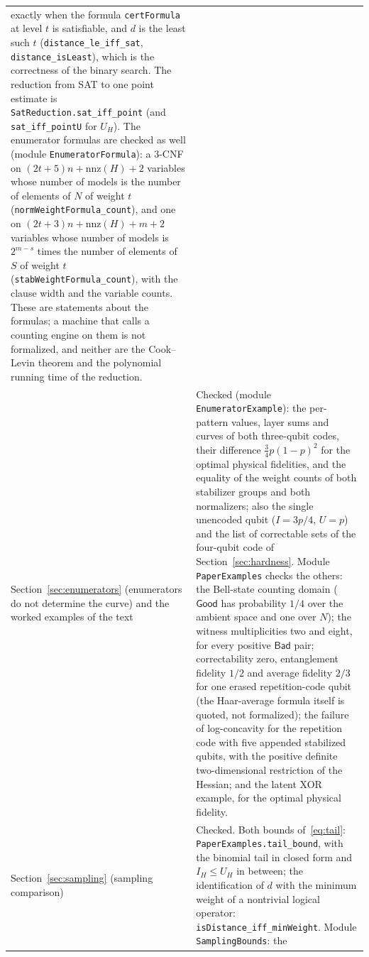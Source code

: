\documentclass[11pt]{article}
\theoremstyle{remark}
\newcommand{\Good}{\mathsf{Good}}
\newcommand{\Bad}{\mathsf{Bad}}
\newcommand{\lean}[1]{\texttt{#1}}
\begin{document}
{\begin{longtable}{@{}p{}p{}@{}}
exactly when the formula \lean{certFormula} at level \(t\) is
satisfiable, and \(d\) is the least such \(t\)
(\lean{distance\_le\_iff\_sat}, \lean{distance\_isLeast}), which is the
correctness of the binary search. The reduction from SAT to one point
estimate is \lean{SatReduction.sat\_iff\_point} (and
\lean{sat\_iff\_pointU} for \(U_H\)). The enumerator formulas are
checked as well (module \lean{EnumeratorFormula}): a 3-CNF on
\((2t+5)n+\mathrm{nnz}(H)+2\) variables whose number of models is the
number of elements of \(N\) of weight \(t\)
(\lean{normWeightFormula\_count}), and one on
\((2t+3)n+\mathrm{nnz}(H)+m+2\) variables whose number of models is
\(2^{m-s}\) times the number of elements of \(S\) of weight \(t\)
(\lean{stabWeightFormula\_count}), with the clause width and the
variable counts. These are statements about the formulas; a machine
that calls a counting engine on them is not formalized, and neither are
the Cook--Levin theorem and the polynomial running time of the
reduction.\\
Section~\ref{sec:enumerators} (enumerators do not determine the curve)
and the worked examples of the text &
Checked (module \lean{EnumeratorExample}): the per-pattern values, layer
sums and curves of both three-qubit codes, their difference
\(\tfrac34p(1-p)^2\) for the optimal physical fidelities, and the
equality of the weight counts of both stabilizer groups and both
normalizers; also the single unencoded qubit (\(I=3p/4\), \(U=p\)) and
the list of correctable sets of the four-qubit code of
Section~\ref{sec:hardness}. Module \lean{PaperExamples} checks the
others: the Bell-state counting domain (\(\Good\) has probability \(1/4\)
over the ambient space and one over \(N\)); the witness multiplicities
two and eight, for every positive \(\Bad\) pair; correctability zero,
entanglement fidelity \(1/2\) and average fidelity \(2/3\) for one erased
repetition-code qubit (the Haar-average formula itself is quoted, not
formalized); the failure of log-concavity for the repetition code with
five appended stabilized qubits, with the positive definite
two-dimensional restriction of the Hessian; and the latent XOR example,
for the optimal physical fidelity.\\
Section~\ref{sec:sampling} (sampling comparison) &
Checked. Both bounds of~\eqref{eq:tail}:
\lean{PaperExamples.tail\_bound}, with the binomial tail in closed form
and \(I_H\le U_H\) in between; the identification of \(d\) with the
minimum weight of a nontrivial logical operator:
\lean{isDistance\_iff\_minWeight}. Module \lean{SamplingBounds}: the

\end{longtable}}
\end{document}

